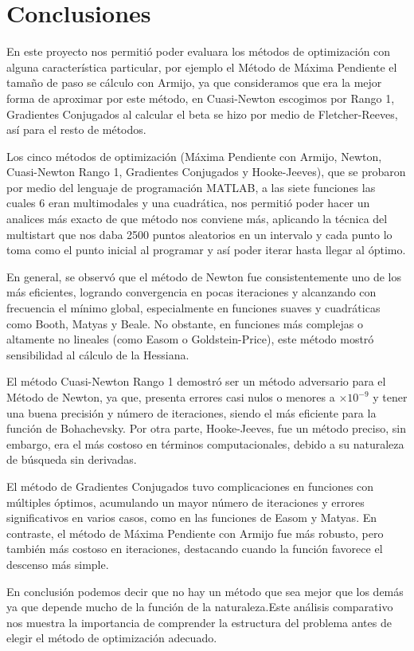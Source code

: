 \chapter{Conclusiones}

En este proyecto nos permitió poder evaluara los métodos de optimización con alguna característica particular, por ejemplo el Método de Máxima Pendiente el tamaño de paso se cálculo con Armijo, ya que consideramos que era la mejor forma de aproximar por este método, en Cuasi-Newton escogimos por Rango 1, Gradientes Conjugados al calcular el beta se hizo por medio de Fletcher-Reeves, así para el resto de métodos.

Los cinco métodos de optimización (Máxima Pendiente con Armijo, Newton, Cuasi-Newton Rango 1, Gradientes Conjugados y Hooke-Jeeves), que se probaron por medio del lenguaje de programación MATLAB, a las siete funciones las cuales 6 eran multimodales y una cuadrática, nos permitió poder hacer un analices más exacto de que método nos conviene más, aplicando la técnica del multistart que nos daba 2500 puntos aleatorios en un intervalo y cada punto lo toma como el punto inicial al programar y así poder iterar hasta llegar al óptimo.

En general, se observó que el método de Newton fue consistentemente uno de los más eficientes, logrando convergencia en pocas iteraciones y alcanzando con frecuencia el mínimo global, especialmente en funciones suaves y cuadráticas como Booth, Matyas y Beale. No obstante, en funciones más complejas o altamente no lineales (como Easom o Goldstein-Price), este método mostró sensibilidad al cálculo de la Hessiana.

El método Cuasi-Newton Rango 1 demostró ser un método adversario para el Método de Newton, ya que, presenta errores casi nulos o menores a $\times 10^{-9}$ y tener una buena  precisión y número de iteraciones, siendo el más eficiente para la función de Bohachevsky. Por otra parte, Hooke-Jeeves, fue un método preciso, sin embargo, era el  más costoso en términos computacionales, debido a su naturaleza de búsqueda sin derivadas.

El método de Gradientes Conjugados tuvo complicaciones en funciones con múltiples óptimos, acumulando un mayor número de iteraciones y errores significativos en varios casos, como en las funciones de Easom y Matyas. En contraste, el método de Máxima Pendiente con Armijo fue más robusto, pero también más costoso en iteraciones, destacando cuando la función favorece el descenso más simple.

En conclusión podemos decir que no hay un método que sea mejor que los demás ya que depende mucho de la función de la naturaleza.Este análisis comparativo nos muestra la importancia de comprender la estructura del problema antes de elegir el método de optimización adecuado.